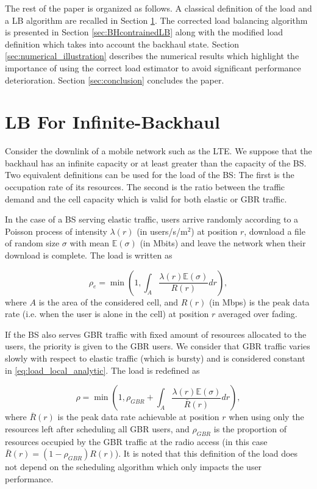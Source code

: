 \documentclass[10pt,draftclsnofoot,onecolumn]{IEEEtran}
\begin{document}
The rest of the paper is organized as follows. A classical
definition of the load and a \ac{LB} algorithm
are recalled in Section \ref{sec:legacyLB}. The corrected load
balancing algorithm is presented in Section \ref{sec:BHcontrainedLB}
along with the modified load definition which takes into account the
backhaul state. Section \ref{sec:numerical_illustration} describes
the numerical results which highlight the importance of using the
correct load estimator to avoid significant performance
deterioration. Section \ref{sec:conclusion} concludes the paper.


\section{\ac{LB} For Infinite-Backhaul} \label{sec:legacyLB}

Consider the downlink of a mobile network such as the \ac{LTE}. We
suppose that the backhaul has an infinite capacity or at least
greater than the capacity of the \ac{BS}. Two equivalent definitions
can be used for the load of the \ac{BS}: The first is  the
occupation rate of its resources. The second is the ratio between
the traffic demand and the cell capacity which is valid for both
elastic or \ac{GBR} traffic.


In the case of a \ac{BS} serving elastic traffic, users arrive
randomly according to a Poisson process of intensity $\lambda(r)$ (in users/s/m$^2$) at position $r$,
download a file of random size $\sigma$ with mean $\mathbb{E}(\sigma)$ (in Mbits) and
leave the network when their download is complete. The load is
written as \cite{bonald_wirelessdownlinkdata_2003a}

    \begin{equation} \label{eq:load_bonald}
    \rho_e = \min \left(1, \int_A \frac{\lambda(r) \mathbb{E}(\sigma)}{R(r)} dr \right),
    \end{equation}
where $A$ is the area of the considered cell, 
and $R(r)$ (in Mbps) is the peak data rate (i.e. when the user is 
alone in the cell) at position $r$ averaged over fading.

If the \ac{BS} also serves \ac{GBR} traffic with fixed amount of
resources allocated to the users, the priority is
given to the \ac{GBR} users. 
We consider that \ac{GBR} traffic varies slowly with respect 
to elastic traffic (which is bursty) and is considered constant in \eqref{eq:load_local_analytic}.
The load is redefined as

    \begin{equation} \label{eq:load_local_analytic}
    \rho = \min \left(1, \rho_{GBR} + \int_A \frac{\lambda(r) \mathbb{E}(\sigma)}{\bar{R}(r)} dr \right),
    \end{equation}
where $\bar{R}(r)$ is the peak data rate achievable at position $r$
when using only the resources left after scheduling all \ac{GBR}
users, and $\rho_{GBR}$ is the proportion of resources occupied
by the \ac{GBR} traffic at the radio access (in this case $\bar{R}(r) = (1 - \rho_{GBR}) R(r)$). 
It is noted that this definition
of the load does not depend on the scheduling algorithm which
only impacts the user performance.
\end{document}
